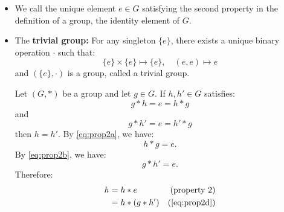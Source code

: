 \begin{itemize}
\begin{proposition}
\begin{equation}
            g*e' = g = e' * g,
            \label{eq:prop1b}
        \end{equation}
        then $e=e'$.
        \begin{proof}
            Consider $e*e'$. By \ref{eq:prop1a}, we have:
            \begin{equation}
                e*e'= e'
            \end{equation}
            Similarly, by \ref{eq:prop1b}, we have:
            \begin{equation}
                e*e' = e
            \end{equation}
            Therefore, $e=e*e'=e'$.
        \end{proof}
    \end{proposition}
    \item We call the unique element $e\in G$ satisfying the second property in the definition of a group, the identity element of $G$.
    \item The \textbf{trivial group:} For any singleton $\{e\}$, there exists a unique binary operation $\cdot$ such that:
    \begin{equation}
        \{e\} \times \{e\} \mapsto \{e\},\quad (e,e) \mapsto e
    \end{equation}
    and $(\{e\},\cdot)$ is a group, called a trivial group.
    \begin{proposition}
        Let $(G,*)$ be a group and let $g\in G$. If $h,h' \in G$ satisfies:
        \begin{equation}
            g*h = e = h*g
            \label{eq:prop2a}
        \end{equation}
        and
        \begin{equation}
            g*h' = e = h'*g
            \label{eq:prop2b}
        \end{equation}
        then $h=h'$. By \ref{eq:prop2a}, we have:
        \begin{equation}
            h*g = e.
            \label{eq:prop2c}
        \end{equation}
        By \ref{eq:prop2b}, we have:
        \begin{equation}
            g*h' = e.
            \label{eq:prop2d}
        \end{equation}
        Therefore:
        \begin{align}
            h &= h*e & \text{(property 2)}\\ 
            &= h*(g*h') & \text{(\ref{eq:prop2d})} \\ 

\end{align}
\end{proposition}
\end{itemize}
